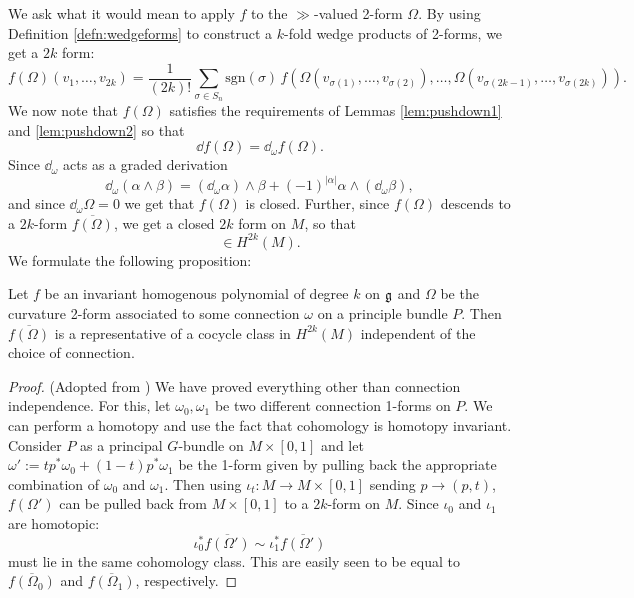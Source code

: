 		We ask what it would mean to apply $f$ to the $\gg$-valued 2-form $\Omega$. By using Definition \ref{defn:wedgeforms} to construct a $k$-fold wedge products of 2-forms, we get a $2k$ form:
		\[
			f(\Omega)(v_1, \dots, v_{2k}) = \frac{1}{(2k)!} \sum_{\sigma \in S_n} \mathrm{sgn}(\sigma)\, f\left(\Omega(v_{\sigma(1)}, \dots, v_{\sigma(2)}), \dots ,\Omega(v_{\sigma(2k-1)}, \dots, v_{\sigma(2k)})\right).
		\]
		We now note that $f(\Omega)$ satisfies the requirements of Lemmas \ref{lem:pushdown1} and \ref{lem:pushdown2} so that 
		\[
			\dd f(\Omega) = \dd_\omega f(\Omega).
		\]
		Since $\dd_\omega$ acts as a graded derivation
		\[
			\dd_\omega (\alpha \wedge \beta) = (\dd_\omega \alpha) \wedge \beta + (-1)^{|\alpha|} \alpha \wedge (\dd_\omega \beta),
		\]
		and since $\dd_\omega \Omega = 0$ we get that $f(\Omega)$ is closed. Further, since $f(\Omega)$ descends to a $2k$-form $\overline{f(\Omega)}$, we get a closed $2k$ form on $M$, so that
		\begin{equation}
			[\overline{f(\Omega)}] \in H^{2k} (M).
		\end{equation}
		We formulate the following proposition:
		\begin{theorem}
			Let $f$ be an invariant homogenous polynomial of degree $k$ on $\frak g$ and $\Omega$ be the curvature 2-form associated to some connection $\omega$ on a principle bundle $P$. Then $\overline{f(\Omega)}$ is a representative of a cocycle class in $H^{2k}(M)$ independent of the choice of connection.
		\label{thm:chern-weil}
		\end{theorem}
		\begin{proof}(Adopted from \cite{matthew2012})
			We have proved everything other than connection independence. For this, let $\omega_0, \omega_1$ be two different connection 1-forms on $P$. We can perform a homotopy and use the fact that cohomology is homotopy invariant. Consider $P$ as a principal $G$-bundle on $M \times [0, 1]$ and let $\omega':= t p^* \omega_0 + (1-t)  p^* \omega_1$ be the 1-form given by pulling back the appropriate combination of $\omega_0$ and $\omega_1$. Then using $\iota_t: M \to M \times [0,1]$ sending $p \to (p, t)$, $f(\Omega')$ can be pulled back from $M \times [0, 1]$ to a $2k$-form on $M$. Since $\iota_0$ and $\iota_1$ are homotopic:
			\[
				\iota_0^* \overline{f(\Omega')} \sim \iota_1^* \overline{f(\Omega')}
			\]
			must lie in the same cohomology class. This are easily seen to be equal to $\overline{f(\Omega_0)}$ and $\overline{f(\Omega_1)}$, respectively.
		\end{proof}

